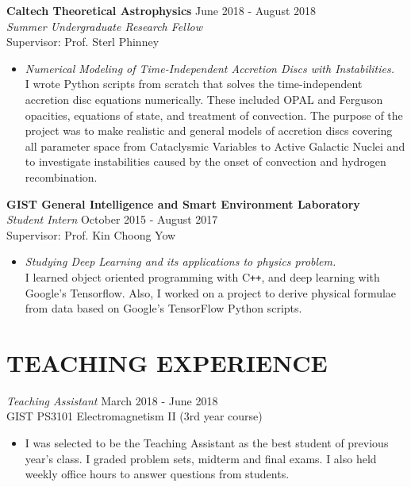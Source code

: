 \documentclass[margin, 10pt]{res} %
\begin{document}
\begin{resume}
{\bf Caltech Theoretical Astrophysics} \hfill June 2018 - August 2018 \\
{\sl Summer Undergraduate Research Fellow} \\
Supervisor: Prof. Sterl Phinney
\begin{itemize}
\item[] {\sl Numerical Modeling of Time-Independent Accretion Discs with Instabilities.}\\
I wrote Python scripts from scratch that solves the time-independent accretion disc equations numerically. These included OPAL and Ferguson opacities, equations of state, and treatment of convection. The purpose of the project was to make realistic and general models of accretion discs covering all parameter space from Cataclysmic Variables to Active Galactic Nuclei and to investigate instabilities caused by the onset of convection and hydrogen recombination.
\end{itemize} 

{\bf GIST General Intelligence and Smart Environment Laboratory}\\
{\sl Student Intern} \hfill October 2015 - August 2017 \\
Supervisor: Prof. Kin Choong Yow
\begin{itemize}
\item[] {\sl Studying Deep Learning and its applications to physics problem.}\\
I learned object oriented programming with C\texttt{++}, and deep learning with Google's Tensorflow. Also, I worked on a project to derive physical formulae from data based on Google's TensorFlow Python scripts.
\end{itemize} 

\section{TEACHING EXPERIENCE}

{\sl Teaching Assistant} \hfill March 2018 - June 2018 \\
GIST PS3101 Electromagnetism II (3rd year course)
\begin{itemize} \itemsep -2pt %
\item[] I was selected to be the Teaching Assistant as the best student of previous year's class. I graded problem sets, midterm and final exams. I also held weekly office hours to answer questions from students.
\end{itemize}


\end{resume}
\end{document}
